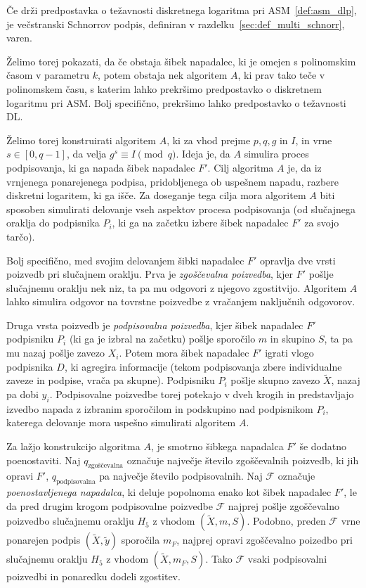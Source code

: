 \documentclass[isrm2, tisk]{fmfdelo}
\begin{document}
\begin{izrek}
    Če drži predpostavka o težavnosti diskretnega logaritma pri ASM~\ref{def:asm_dlp}, je večstranski 
    Schnorrov podpis, definiran v razdelku~\ref{sec:def_multi_schnorr}, varen.
\end{izrek}

Želimo torej pokazati, da če obstaja šibek napadalec, ki je omejen s polinomskim časom v parametru
$k$, potem obstaja nek algoritem $A$, ki prav tako teče v polinomskem času, s katerim lahko prekršimo
predpostavko o diskretnem logaritmu pri ASM. Bolj specifično, prekršimo lahko predpostavko o
težavnosti DL.

Želimo torej konstruirati algoritem $A$, ki za vhod prejme $p, q, g$ in $I$, in vrne $s \in [0, q - 1]$,
da velja $g^s \equiv I \pmod q$. Ideja je, da $A$ simulira proces podpisovanja, ki ga napada šibek
napadalec $F'$. Cilj algoritma $A$ je, da iz vrnjenega ponarejenega podpisa, pridobljenega ob
uspešnem napadu, razbere diskretni logaritem, ki ga išče. Za doseganje tega cilja mora algoritem $A$
biti sposoben simulirati delovanje vseh aspektov procesa podpisovanja (od slučajnega oraklja do
podpisnika $P_i$, ki ga na začetku izbere šibek napadalec $F'$ za svojo tarčo).

Bolj specifično, med svojim delovanjem šibki napadalec $F'$ opravlja dve vrsti poizvedb pri slučajnem
oraklju. Prva je \textit{zgoščevalna poizvedba}, kjer $F'$ pošlje slučajnemu oraklju nek niz, ta pa
mu odgovori z njegovo zgostitvijo. Algoritem $A$ lahko simulira odgovor na tovrstne poizvedbe z vračanjem
naključnih odgovorov.

Druga vrsta poizvedb je \textit{podpisovalna poizvedba}, kjer šibek napadalec $F'$ podpisniku $P_i$
(ki ga je izbral na začetku) pošlje sporočilo $m$ in skupino $S$, ta pa mu nazaj pošlje zavezo $X_i$.
Potem mora šibek napadalec $F'$ igrati vlogo podpisnika $D$, ki agregira informacije (tekom podpisovanja
zbere individualne zaveze in podpise, vrača pa skupne). Podpisniku $P_i$ pošlje skupno zavezo
$\tilde{X}$, nazaj pa dobi $y_i$. Podpisovalne poizvedbe torej potekajo v dveh krogih in predstavljajo
izvedbo napada z izbranim sporočilom in podskupino nad podpisnikom $P_i$, katerega delovanje mora
uspešno simulirati algoritem $A$.

Za lažjo konstrukcijo algoritma $A$, je smotrno šibkega napadalca $F'$ še dodatno poenostaviti. Naj
$q_{\text{zgoščevalna}}$ označuje največje število zgoščevalnih poizvedb, ki jih opravi $F'$,
$q_{\text{podpisovalna}}$ pa največje število podpisovalnih. Naj $\mathcal{F}$ označuje
\textit{poenostavljenega napadalca}, ki deluje popolnoma enako kot šibek napadalec $F'$, le da pred
drugim krogom podpisovalne poizvedbe $\mathcal{F}$ najprej pošlje zgoščevalno poizvedbo slučajnemu
oraklju $H_5$ z vhodom $(\tilde{X}, m, S)$. Podobno, preden $\mathcal{F}$ vrne ponarejen podpis
$(\tilde{X}, \tilde{y})$ sporočila $m_F$, najprej opravi zgoščevalno poizedbo pri slučajnemu oraklju
$H_5$ z vhodom $(\tilde{X}, m_F, S)$. Tako $\mathcal{F}$ vsaki podpisovalni poizvedbi in ponaredku
dodeli zgostitev.
\end{document}
